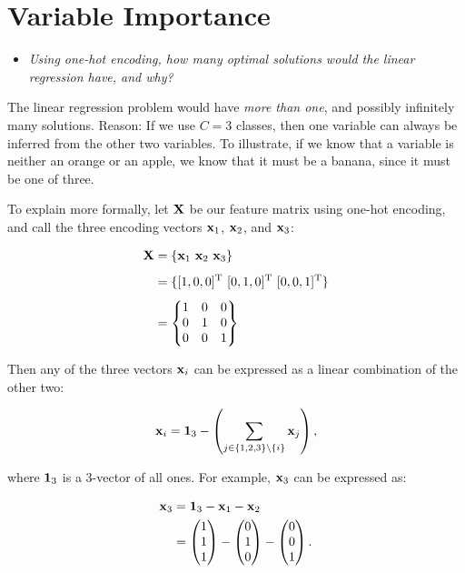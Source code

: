 \section{Variable Importance}

\begin{itemize}
  \item \textit{Using one-hot encoding, how many optimal solutions would the linear
    regression have, and why?}
\end{itemize}

The linear regression problem would have \textit{more than one}, and possibly
infinitely many solutions. Reason: If we use $C = 3$ classes, then one variable
can always be inferred from the other two variables. To illustrate, if we know
that a variable is neither an orange or an apple, we know that it must be a
banana, since it must be one of three.

\medskip

To explain more formally, let $\mathbf{X}$ be our feature matrix using one-hot
encoding, and call the three encoding vectors $\mathbf{x}_1$, $\mathbf{x}_2$, and $\mathbf{x}_3$:

\begin{align}
\mathbf{X} &= \{\mathbf{x}_1\ \mathbf{x}_2\ \mathbf{x}_3\}\nonumber\\[4pt]
  &= \{[1, 0, 0]^{\text{T}}\  [0, 1, 0]^{\text{T}}\  [0, 0,
  1]^{\text{T}}\}\nonumber\\[4pt]
  &= \begin{Bmatrix}
    1 & 0 & 0\\
    0 & 1 & 0\\
    0 & 0 & 1
  \end{Bmatrix}
  \label{eq:X}
\end{align}

Then any of the three vectors $\mathbf{x}_i$ can be expressed as a linear
combination of the other two:

\begin{align*}
  \mathbf{x}_i = \mathbf{1}_3 - \left(\sum_{j \in \{1, 2, 3\} \setminus \{i\}} \mathbf{x}_j\right),
\end{align*}

where $\mathbf{1}_3$ is a 3-vector of all ones. For example, $\mathbf{x}_3$ can be expressed
as:

\begin{align*}
  \mathbf{x}_3 &= \mathbf{1}_3 - \mathbf{x}_1 - \mathbf{x}_2\\
  &= \begin{pmatrix} 1\\1\\1\end{pmatrix}
    - \begin{pmatrix}0\\1\\0\end{pmatrix} -
      \begin{pmatrix}0\\0\\1\end{pmatrix}.
\end{align*}

